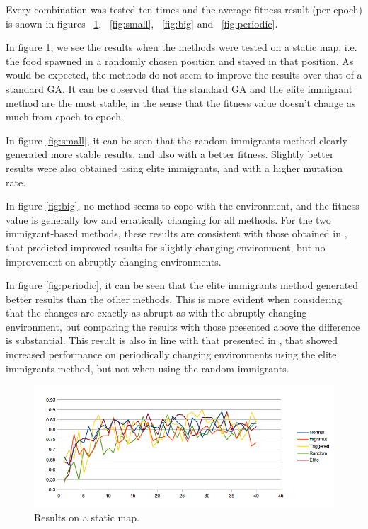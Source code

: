 \documentclass[a4paper,12pt]{article}
\begin{document}
Every combination was tested ten times and the average fitness result (per epoch) is shown in figures ~\ref{fig:static}, ~\ref{fig:small}, ~\ref{fig:big} and ~\ref{fig:periodic}.

In figure \ref{fig:static}, we see the results when the methods were tested on a static map, i.e. the food spawned in a randomly chosen position and stayed in that position. As would be expected, the methods do not seem to improve the results over that of a standard GA. It can be observed that the standard GA and the elite immigrant method are the most stable, in the sense that the fitness value doesn't change as much from epoch to epoch.

In figure \ref{fig:small}, it can be seen that the random immigrants method clearly generated more stable results, and also with a better fitness. Slightly better results were also obtained using elite immigrants, and with a higher mutation rate. 

In figure \ref{fig:big}, no method seems to cope with the environment, and the fitness value is generally low and erratically changing for all methods. For the two immigrant-based methods, these results are consistent with those obtained in \cite{yang}, that predicted improved results for slightly changing environment, but no improvement on abruptly changing environments.

In figure \ref{fig:periodic}, it can be seen that the elite immigrants method generated better results than the other methods. This is more evident when considering that the changes are exactly as abrupt as with the abruptly changing environment, but comparing the results with those presented above the difference is substantial. This result is also in line with that presented in \cite{yang}, that showed increased performance on periodically changing environments using the elite immigrants method, but not when using the random immigrants.

\begin{figure}[]
\begin{center}
\includegraphics[width=\textwidth]{static.png}
 \caption[]   {Results on a static map.}
\label{fig:static}
\end{center}
\end{figure}
\end{document}
